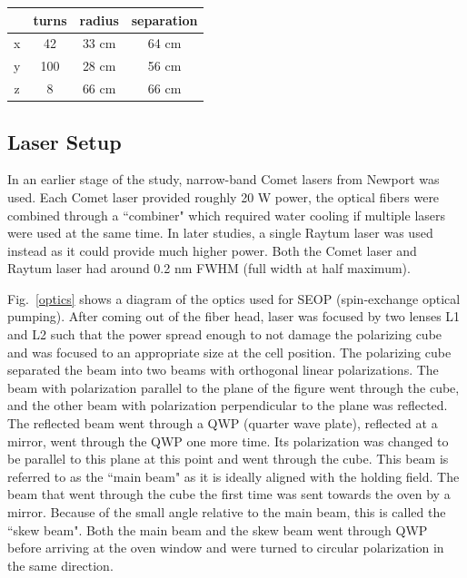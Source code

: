 \begin{center}
	\begin{tabular}{ | c | c| c| c | }
		\hline
		& turns & radius & separation \\ \hline
		x & 42 & 33 cm & 64 cm \\ \hline 
		y & 100 & 28 cm & 56 cm \\ \hline
		z & 8 & 66 cm & 66 cm \\
		\hline
	\end{tabular}
\end{center}\label{gradient_coils_table}

\subsection{Laser Setup}

In an earlier stage of the study, narrow-band Comet lasers from Newport was used. Each Comet laser provided roughly 20 W power, the optical fibers were combined through a ``combiner" which required water cooling if multiple lasers were used at the same time. In later studies, a single Raytum laser was used instead as it could provide much higher power. Both the Comet laser and Raytum laser had around 0.2 nm FWHM (full width at half maximum).

Fig.~\ref{optics} shows a diagram of the optics used for SEOP (spin-exchange optical pumping). After coming out of the fiber head, laser was focused by two lenses L1 and L2 such that the power spread enough to not damage the polarizing cube and was focused to an appropriate size at the cell position. The polarizing cube separated the beam into two beams with orthogonal linear polarizations. The beam with polarization parallel to the plane of the figure went through the cube, and the other beam with polarization perpendicular to the plane was reflected. The reflected beam went through a QWP (quarter wave plate), reflected at a mirror, went through the QWP one more time. Its polarization was changed to be parallel to this plane at this point and went through the cube. This beam is referred to as the ``main beam" as it is ideally aligned with the holding field. The beam that went through the cube the first time was sent towards the oven by a mirror. Because of the small angle relative to the main beam, this is called the ``skew beam". Both the main beam and the skew beam went through QWP before arriving at the oven window and were turned to circular polarization in the same direction.

